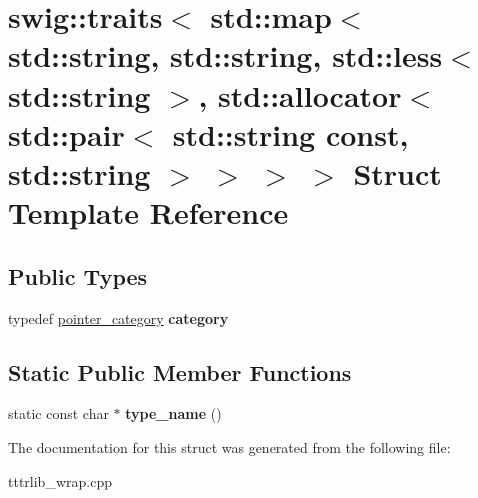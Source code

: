 \hypertarget{structswig_1_1traits_3_01std_1_1map_3_01std_1_1string_00_01std_1_1string_00_01std_1_1less_3_01stb4c8f1700a1e872539a20cebacbb44c7}{}\section{swig\+:\+:traits$<$ std\+:\+:map$<$ std\+:\+:string, std\+:\+:string, std\+:\+:less$<$ std\+:\+:string $>$, std\+:\+:allocator$<$ std\+:\+:pair$<$ std\+:\+:string const, std\+:\+:string $>$ $>$ $>$ $>$ Struct Template Reference}
\label{structswig_1_1traits_3_01std_1_1map_3_01std_1_1string_00_01std_1_1string_00_01std_1_1less_3_01stb4c8f1700a1e872539a20cebacbb44c7}
\subsection*{Public Types}
\begin{DoxyCompactItemize}
\item 
\mbox{\label{structswig_1_1traits_3_01std_1_1map_3_01std_1_1string_00_01std_1_1string_00_01std_1_1less_3_01stb4c8f1700a1e872539a20cebacbb44c7_a6c8ab0c84f164e69563d6ecc038049ac}} 
typedef \hyperlink{structswig_1_1pointer__category}{pointer\+\_\+category} {\bfseries category}
\end{DoxyCompactItemize}
\subsection*{Static Public Member Functions}
\begin{DoxyCompactItemize}
\item 
\mbox{\label{structswig_1_1traits_3_01std_1_1map_3_01std_1_1string_00_01std_1_1string_00_01std_1_1less_3_01stb4c8f1700a1e872539a20cebacbb44c7_a0e6a99ff6dcd87851797c4783fc0eee8}} 
static const char $\ast$ {\bfseries type\+\_\+name} ()
\end{DoxyCompactItemize}


The documentation for this struct was generated from the following file\+:\begin{DoxyCompactItemize}
\item 
tttrlib\+\_\+wrap.\+cpp\end{DoxyCompactItemize}
